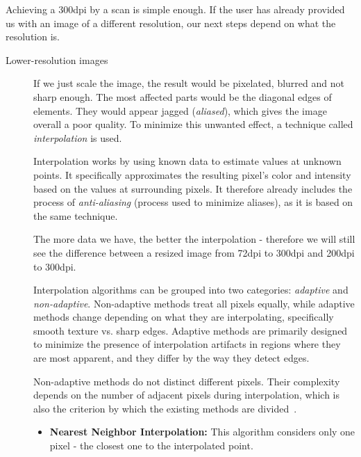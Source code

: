 Achieving  a 300dpi by a scan is simple enough. If the user has already provided us with an image of a different resolution, our next steps depend on what the resolution is.
\begin{description}
\item[Lower-resolution images] If we   just scale the image, the result would be pixelated, blurred and not sharp enough. The most affected parts would be the diagonal edges of elements. They would appear jagged (\emph{aliased}), which gives the image overall a poor quality. To minimize this unwanted effect, a technique called \emph{interpolation} is used.

Interpolation works by using known data to estimate values at unknown points. It specifically approximates the resulting pixel's color and intensity based on the values at surrounding pixels. It therefore already includes the process of \emph{anti-aliasing} (process used to minimize aliases), as it is based on the same technique.

The more data we have, the better the interpolation - therefore we will still see the difference between a resized image from 72dpi to 300dpi and 200dpi to 300dpi.

Interpolation algorithms can be grouped into two categories: \emph{adaptive} and \emph{non-adaptive}. Non-adaptive methods treat all pixels equally, while adaptive methods change depending on what they are interpolating, specifically smooth texture vs. sharp edges. Adaptive methods are primarily designed to minimize the presence of interpolation artifacts in regions where they are most apparent, and they differ by the way they detect edges.

Non-adaptive methods do not distinct different pixels. Their complexity depends on the number of adjacent pixels during interpolation, which is also the criterion by which the existing methods are divided~\cite{interpolation}.

\begin{itemize}
\item\textbf {Nearest Neighbor Interpolation: } This  algorithm considers only one pixel - the closest one to the interpolated point.


\end{itemize}
\end{description}

